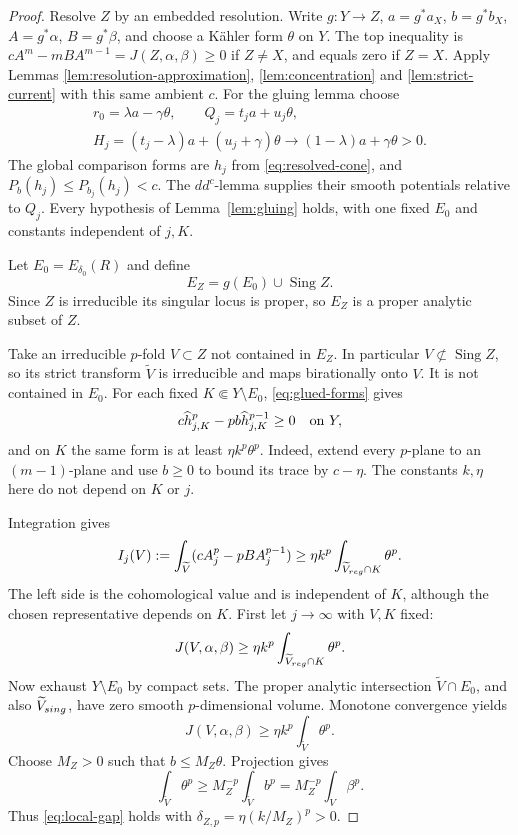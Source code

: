 \documentclass[10pt,a4paper]{amsart}
\begin{document}
\begin{proof}
Resolve \(Z\) by an embedded resolution. Write \(g:Y\to Z\), \(a=g^*a_X\), \(b=g^*b_X\), \(A=g^*\alpha\), \(B=g^*\beta\), and choose a K\"ahler form \(\theta\) on \(Y\). The top inequality is \(cA^m-mBA^{m-1}=J(Z,\alpha,\beta)\ge0\) if \(Z\ne X\), and equals zero if \(Z=X\). Apply Lemmas \ref{lem:resolution-approximation}, \ref{lem:concentration} and \ref{lem:strict-current} with this same ambient \(c\). For the gluing lemma choose
\[
\begin{gathered}
r_0=\lambda a-\gamma\theta,\qquad Q_j=t_ja+u_j\theta,\\
H_j=(t_j-\lambda)a+(u_j+\gamma)\theta
\longrightarrow(1-\lambda)a+\gamma\theta>0.
\end{gathered}
\]
The global comparison forms are \(h_j\) from \eqref{eq:resolved-cone}, and \(P_b(h_j)\le P_{b_j}(h_j)<c\). The \(dd^c\)-lemma supplies their smooth potentials relative to \(Q_j\). Every hypothesis of Lemma~\ref{lem:gluing} holds, with one fixed \(E_0\) and constants independent of \(j,K\).

Let \(E_0=E_{\delta_0}(R)\) and define
\[
E_Z=g(E_0)\cup\operatorname{Sing}Z.
\]
 Since \(Z\) is irreducible its singular locus is proper, so \(E_Z\) is a proper analytic subset of $Z$.

Take an irreducible \(p\)-fold \(V\subset Z\) not contained in \(E_Z\). In particular \(V\not\subset\operatorname{Sing}Z\), so its strict transform \(\widetilde V\) is irreducible and maps birationally onto \(V\). It is not contained in \(E_0\). For each fixed \(K\Subset Y\setminus E_0\), \eqref{eq:glued-forms} gives
\[
c\widehat h_{j,K}^p-pb\widehat h_{j,K}^{p-1}\ge0
\quad\hbox{on }Y,
\]
and on \(K\) the same form is at least \(\eta k^p\theta^p\). Indeed, extend every \(p\)-plane to an \((m-1)\)-plane and use \(b\ge0\) to bound its trace by \(c-\eta\). The constants \(k,\eta\) here do not depend on \(K\) or \(j\).

Integration gives
\[
I_j(V):=\int_{\widetilde V}(cA_j^p-pBA_j^{p-1})
\ge\eta k^p\int_{\widetilde V_{\rm reg}\cap K}\theta^p.
\]
The left side is the cohomological value and is independent of \(K\), although the chosen representative depends on \(K\). First let \(j\to\infty\) with \(V,K\) fixed:
\[
J(V,\alpha,\beta)\ge\eta k^p\int_{\widetilde V_{\rm reg}\cap K}\theta^p.
\]
Now exhaust \(Y\setminus E_0\) by compact sets. The proper analytic intersection \(\widetilde V\cap E_0\), and also \(\widetilde V_{\rm sing}\), have zero smooth \(p\)-dimensional volume. Monotone convergence yields
\[
J(V,\alpha,\beta)\ge\eta k^p\int_{\widetilde V}\theta^p.
\]
Choose \(M_Z>0\) such that \(b\le M_Z\theta\). Projection gives
\[
\int_{\widetilde V}\theta^p
\ge M_Z^{-p}\int_{\widetilde V}b^p
=M_Z^{-p}\int_V\beta^p.
\]
Thus \eqref{eq:local-gap} holds with \(\delta_{Z,p}=\eta(k/M_Z)^p>0\).


\end{proof}
\end{document}
